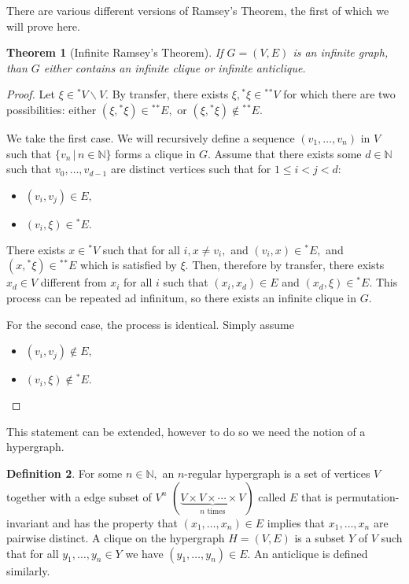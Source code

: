 \documentclass[12pt]{amsart}
\newcommand{\stt}{{}^*}
\newcommand{\NN}{\mathbb{N}}
\theoremstyle{plain}
\newtheorem{thm}{Theorem}
\theoremstyle{definition}
\newtheorem{defn}[thm]{Definition}
\theoremstyle{remark}
\theoremstyle{theorem}
\numberwithin{equation}{section}
\numberwithin{thm}{section}
\begin{document}
There are various different versions of Ramsey's Theorem, the first of which we will prove here.
\begin{thm}[Infinite Ramsey's Theorem]
\label{thm:IRT} If $G = (V,E)$ is an infinite graph, than $G$ either contains an infinite clique or infinite anticlique.
\end{thm}
\begin{proof}
Let $\xi \in \stt V \backslash V.$ By transfer, there exists $\xi, \stt \xi \in \stt \stt V$ for which there are two possibilities: either $(\xi, \stt \xi) \in \stt \stt E,$ or $(\xi, \stt \xi) \not\in \stt \stt E.$

We take the first case. We will recursively define a sequence $(v_1, \ldots, v_n)$ in $V$ such that $\{v_n \, | \, n \in \NN\}$ forms a clique in $G.$ Assume that there exists some $d \in \NN$ such that $v_0, \ldots , v_{d-1}$ are distinct vertices such that for $1 \leq i < j < d:$
\begin{itemize}
    \item $(v_i, v_j) \in E,$
    \item $(v_i, \xi) \in \stt E.$
\end{itemize}
There exists $x \in \stt V$ such that for all $i, x \neq v_i,$ and $(v_i, x) \in \stt E,$ and $(x, \stt \xi) \in \stt \stt E$ which is satisfied by $\xi.$ Then, therefore by transfer, there exists $x_d \in V$ different from $x_i$ for all $i$ such that $(x_i, x_d) \in E$ and $(x_d, \xi) \in \stt E.$ This process can be repeated ad infinitum, so there exists an infinite clique in $G.$

For the second case, the process is identical. Simply assume 
\begin{itemize}
    \item $(v_i, v_j) \not \in E,$
    \item $(v_i, \xi) \not \in \stt E.$
\end{itemize}
\end{proof}
This statement can be extended, however to do so we need the notion of a hypergraph. 
\begin{defn}
For some $n \in \NN,$ an $n$-regular hypergraph is a set of vertices $V$ together with a edge subset of $V^n$  $(\underset{n \text{ times}}{\underbrace{V \times V \times \cdots \times V}})$ called $E$ that is permutation-invariant and has the property that $(x_1, \ldots , x_n) \in E$ implies that $x_1, \ldots , x_n$ are pairwise distinct. A clique on the hypergraph $H = (V,E)$ is a subset $Y$ of $V$ such that for all $y_1, \ldots, y_n \in Y$ we have $(y_1, \ldots, y_n)\in E.$ An anticlique is defined similarly.
\end{defn}
\end{document}
